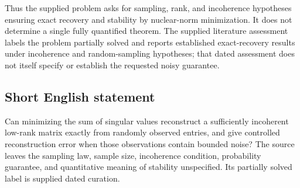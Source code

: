 \documentclass[11pt]{article}
\begin{document}
Thus the supplied problem asks for sampling, rank, and incoherence hypotheses ensuring exact recovery and stability by nuclear-norm minimization. It does not determine a single fully quantified theorem. The supplied literature assessment labels the problem partially solved and reports established exact-recovery results under incoherence and random-sampling hypotheses; that dated assessment does not itself specify or establish the requested noisy guarantee.
\subsection{Short English statement}
Can minimizing the sum of singular values reconstruct a sufficiently incoherent low-rank matrix exactly from randomly observed entries, and give controlled reconstruction error when those observations contain bounded noise? The source leaves the sampling law, sample size, incoherence condition, probability guarantee, and quantitative meaning of stability unspecified. Its partially solved label is supplied dated curation.
\end{document}
